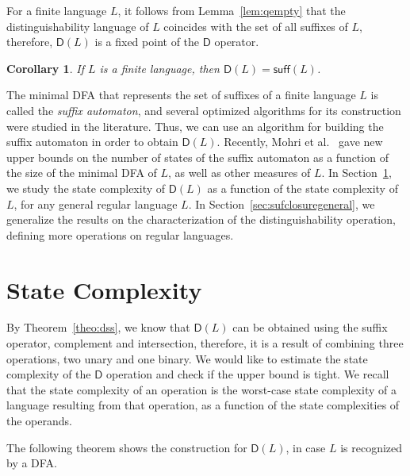 \documentclass{article}
\newtheorem{corollary}{Corollary}
\newcommand{\dfa}{DFA\xspace}
\newcommand{\suff}[1]{\mathsf{suff}(#1)}
\newcommand{\dis}[1]{\mathsf{D}(#1)}
\newcommand{\diso}{\mathsf{D}}
\begin{document}
For a finite language $L$, 
it follows from Lemma~\ref{lem:qempty}
that the
distinguishability language of $L$ coincides with the set of all suffixes of $L$,
therefore, $\dis{L}$ is a fixed point of the $\diso$ operator.

\begin{corollary}
\label{cor:finite}
  If $L$ is a finite language, then $\dis{L}=\suff{L}$.
\end{corollary}



The minimal \dfa that represents the set of suffixes of a finite
language $L$ is called the \emph{suffix automaton}, and several
optimized algorithms for its construction were studied in the
literature. Thus, we can use an algorithm for building the suffix
automaton  in order to obtain $\dis{L}$. Recently, Mohri et
al.~\cite{mohri09:_gener_suffix_autom_const_algor} gave new upper
bounds on the number of states of the suffix automaton as a function
of the size of the minimal \dfa of $L$, as well as other measures of
$L$. In Section~\ref{ssc}, we study the state complexity of
$\dis{L}$ as a function of the state complexity of $L$, for any general regular language $L$. In Section~\ref{sec:sufclosuregeneral}, we generalize the results on the
characterization of the distinguishability operation, defining more operations on regular languages. 

\section{State Complexity}
\label{ssc}
By Theorem~\ref{theo:dss}, we know that $\dis{L}$ can be obtained  
using the suffix operator, complement and intersection,
therefore, it is a result of combining three operations, two unary and one binary.
We would like to estimate the state complexity of the $\diso$ operation and 
check if the upper bound is tight.
We recall that the state complexity of an operation is the worst-case state complexity of a language resulting from that operation, as a function of the state complexities of the operands.
 
The following theorem shows the construction for $\dis{L}$, in case $L$ is recognized by a \dfa.
 
\end{document}
